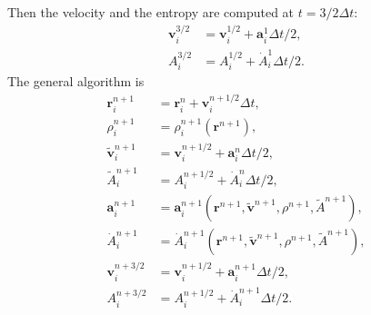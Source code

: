 \documentclass[11pt,a4paper]{article} %
\newcommand{\mb}[1]{\mathbf{#1}}
\begin{document}
Then the velocity and the entropy are computed at $t=3/2 \Delta t$:
\begin{align*}
\mb{v}_i^{3/2} &= \mb{v}_i^{1/2} + \mb{a}_i^1  \Delta t/2,\\
A_i^{3/2} &= A_i^{1/2}+ \dot{A}_i^{1} \Delta t/2 .
\end{align*}
The general algorithm is
\begin{align*}
\mb{r}_i^{n+1} &= \mb{r}_i^n + \mb{v}_i^{n+1/2} \Delta t,\\
\rho_i^{n+1} &= \rho_i^{n+1} (\mb{r}^{n+1}),\\
\tilde{\mb{ v}}_i^{n+1} &= \mb{v}_i^{n+1/2} + \mb{a}_i^{n}  \Delta t/2 ,\\
\tilde{A}_i^{n+1} &= A^{n+1/2}_i + \dot{A}_{i}^{n}  \Delta t/2,\\
\mb{a}_i^{n+1} &= \mb{a}_i^{n+1} ( \mb{r}^{n+1}, \tilde{\mb{v}}^{n+1}, \rho^{n+1}, \tilde{A}^{n+1} ),\\
\dot{A}_i^{n+1} &= \dot{A}_i^{n+1} (\mb{r}^{n+1} ,\tilde{\mb{ v}}^{n+1}, \rho^{n+1}, \tilde A^{n+1} ),\\
\mb{v}_i^{n+3/2} &= \mb{v}_i^{n+1/2} + \mb{a}_i^{n+1}  \Delta t/2,\\
A_i^{n+3/2} &= A_i^{n+1/2}+ \dot{A}_i^{n+1} \Delta t/2 .
\end{align*}



\label{lastpage}
\end{document}

